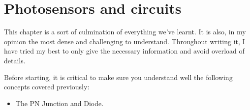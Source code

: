 \newpage
\section{Photosensors and circuits}

This chapter is a sort of culmination of everything we've learnt. It is also, in my opinion the most dense and challenging to understand. Throughout writing it, I have tried my best to only give the necessary information and avoid overload of details.

Before starting, it is critical to make sure you understand well the following concepts covered previously: 
\begin{itemize}
    \item The PN Junction and Diode. 
\end{itemize}
















